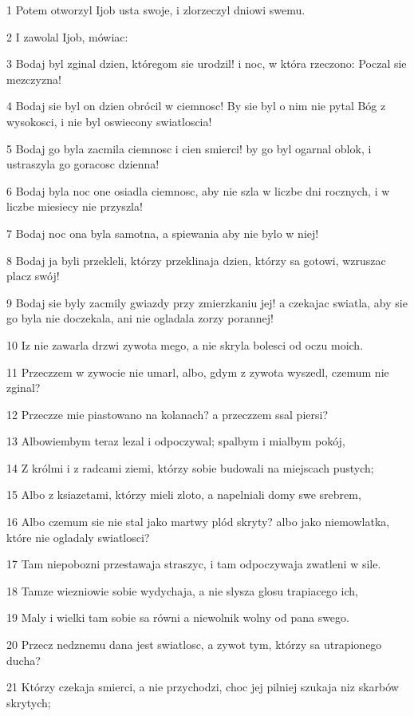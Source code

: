 \par 1 Potem otworzyl Ijob usta swoje, i zlorzeczyl dniowi swemu.
\par 2 I zawolal Ijob, mówiac:
\par 3 Bodaj byl zginal dzien, któregom sie urodzil! i noc, w która rzeczono: Poczal sie mezczyzna!
\par 4 Bodaj sie byl on dzien obrócil w ciemnosc! By sie byl o nim nie pytal Bóg z wysokosci, i nie byl oswiecony swiatloscia!
\par 5 Bodaj go byla zacmila ciemnosc i cien smierci! by go byl ogarnal oblok, i ustraszyla go goracosc dzienna!
\par 6 Bodaj byla noc one osiadla ciemnosc, aby nie szla w liczbe dni rocznych, i w liczbe miesiecy nie przyszla!
\par 7 Bodaj noc ona byla samotna, a spiewania aby nie bylo w niej!
\par 8 Bodaj ja byli przekleli, którzy przeklinaja dzien, którzy sa gotowi, wzruszac placz swój!
\par 9 Bodaj sie byly zacmily gwiazdy przy zmierzkaniu jej! a czekajac swiatla, aby sie go byla nie doczekala, ani nie ogladala zorzy porannej!
\par 10 Iz nie zawarla drzwi zywota mego, a nie skryla bolesci od oczu moich.
\par 11 Przeczzem w zywocie nie umarl, albo, gdym z zywota wyszedl, czemum nie zginal?
\par 12 Przeczze mie piastowano na kolanach? a przeczzem ssal piersi?
\par 13 Albowiembym teraz lezal i odpoczywal; spalbym i mialbym pokój,
\par 14 Z królmi i z radcami ziemi, którzy sobie budowali na miejscach pustych;
\par 15 Albo z ksiazetami, którzy mieli zloto, a napelniali domy swe srebrem,
\par 16 Albo czemum sie nie stal jako martwy plód skryty? albo jako niemowlatka, które nie ogladaly swiatlosci?
\par 17 Tam niepobozni przestawaja straszyc, i tam odpoczywaja zwatleni w sile.
\par 18 Tamze wiezniowie sobie wydychaja, a nie slysza glosu trapiacego ich,
\par 19 Maly i wielki tam sobie sa równi a niewolnik wolny od pana swego.
\par 20 Przecz nedznemu dana jest swiatlosc, a zywot tym, którzy sa utrapionego ducha?
\par 21 Którzy czekaja smierci, a nie przychodzi, choc jej pilniej szukaja niz skarbów skrytych;
